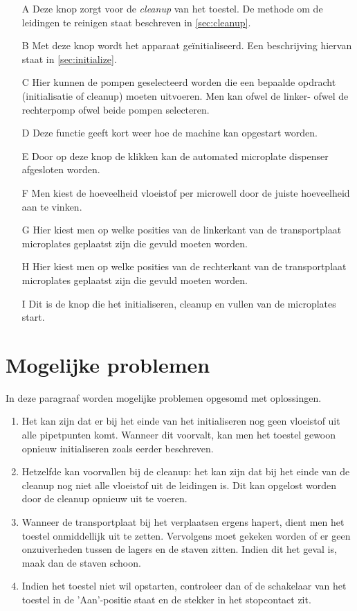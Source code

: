 \documentclass[a4paper,twoside,kulak]{kulakreport} %
\begin{document}
\begin{itemize}
	\item[A] Deze knop zorgt voor de \textit{cleanup} van het toestel. De methode om de leidingen te reinigen staat beschreven in \ref{sec:cleanup}.
	\item[B] Met deze knop wordt het apparaat geïnitialiseerd. Een beschrijving hiervan staat in \ref{sec:initialize}.
	\item[C] Hier kunnen de pompen geselecteerd worden die een bepaalde opdracht (initialisatie of cleanup) moeten uitvoeren. Men kan ofwel de linker- ofwel de rechterpomp ofwel beide pompen selecteren. 
	\item[D] Deze functie geeft kort weer hoe de machine kan opgestart worden.
	\item[E] Door op deze knop de klikken kan de automated microplate dispenser afgesloten worden.
	\item[F] Men kiest de hoeveelheid vloeistof per microwell door de juiste hoeveelheid aan te vinken.
	\item[G] Hier kiest men op welke posities van de linkerkant van de transportplaat microplates geplaatst zijn die gevuld moeten worden. 
	\item[H] Hier kiest men op welke posities van de rechterkant van de transportplaat microplates geplaatst zijn die gevuld moeten worden.
	\item[I] Dit is de knop die het initialiseren, cleanup en vullen van de microplates start.
\end{itemize}



\chapter{Mogelijke problemen}
In deze paragraaf worden mogelijke problemen opgesomd met oplossingen.
\begin{enumerate}
	\item Het kan zijn dat er bij het einde van het initialiseren nog geen vloeistof uit alle pipetpunten komt. Wanneer dit voorvalt, kan men het toestel gewoon opnieuw initialiseren zoals eerder beschreven.
	\item Hetzelfde kan voorvallen bij de cleanup: het kan zijn dat bij het einde van de cleanup nog niet alle vloeistof uit de leidingen is. Dit kan opgelost worden door de cleanup opnieuw uit te voeren. 
	\item Wanneer de transportplaat bij het verplaatsen ergens hapert, dient men het toestel onmiddellijk uit te zetten. Vervolgens moet gekeken worden of er geen onzuiverheden tussen de lagers en de staven zitten. Indien dit het geval is, maak dan de staven schoon.
	\item Indien het toestel niet wil opstarten, controleer dan of de schakelaar van het toestel in de 'Aan'-positie staat en de stekker in het stopcontact zit. 

\end{enumerate}
\end{document}
